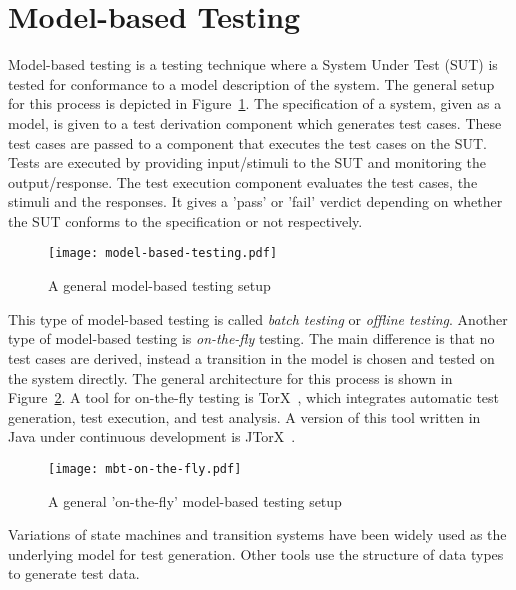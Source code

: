 \section{Model-based Testing}\label{sec:model_based_testing}

Model-based testing is a testing technique where a System Under Test (SUT) is tested for conformance to a model description of the system. The general setup for this process is depicted in Figure~\ref{fig:model_based_testing}. The specification of a system, given as a model, is given to a test derivation component which generates test cases. These test cases are passed to a component that executes the test cases on the SUT. Tests are executed by providing input/stimuli to the SUT and monitoring the output/response. The test execution component evaluates the test cases, the stimuli and the responses. It gives a 'pass' or 'fail' verdict depending on whether the SUT conforms to the specification or not respectively.

\begin{figure}[ht]
  \begin{center}
    \texttt{[image: model-based-testing.pdf]}
  \end{center}
  \caption{A general model-based testing setup}
  \label{fig:model_based_testing}
\end{figure}

This type of model-based testing is called \textit{batch testing} or \textit{offline testing}. Another type of model-based testing is \textit{on-the-fly} testing. The main difference is that no test cases are derived, instead a transition in the model is chosen and tested on the system directly. The general architecture for this process is shown in Figure~\ref{fig:model_based_testing_on_the_fly}. A tool for on-the-fly testing is TorX~\cite{Tretmans:TorX}, which integrates automatic test generation, test execution, and test analysis. A version of this tool written in Java under continuous development is JTorX~\cite{Belinfante:JTorX}.

\begin{figure}[ht]
  \begin{center}
    \texttt{[image: mbt-on-the-fly.pdf]}
  \end{center}
  \caption{A general 'on-the-fly' model-based testing setup}
  \label{fig:model_based_testing_on_the_fly}
\end{figure}

Variations of state machines and transition systems have been widely used as the underlying model for test generation. Other tools use the structure of data types to generate test data. 

